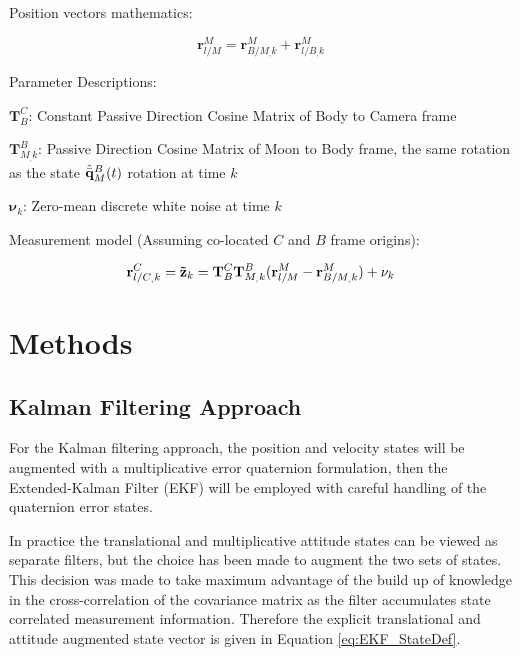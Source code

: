 \documentclass[conf]{new-aiaa}
\newcommand{\vect}[1]{\mathbf{#1}}
\newcommand{\mat}[1]{\mathbf{#1}}
\newcommand{\qBM}{\hat{\Bar{\mathbf{q}}}^B_{M}}    %
\newcommand{\rlO}{\vect{r}^M_{l/M}}
\newcommand{\rBO}{\vect{r}^M_{B/M_,k}}
\newcommand{\rlB}{\vect{r}^M_{l/B_,k}}
\newcommand{\rlBmeas}{\vect{r}^C_{l/C_,k}}
\newcommand{\TBM}{\mat{T}^B_{M_,k}}
\newcommand{\TCB}{\mat{T}^C_{B}}
\begin{document}
\vspace{10pt}

Position vectors mathematics:

\begin{equation}
\rlO = \rBO + \rlB   
\label{eq:MeasRelPosDef}
\end{equation}



Parameter Descriptions:

$\TCB$: Constant Passive Direction Cosine Matrix of Body to Camera frame

$\TBM$: Passive Direction Cosine Matrix of Moon to Body frame, the same rotation as the state $\qBM(t)$ rotation at time $k$

$\vect{\nu}_{k}$: Zero-mean discrete white noise at time $k$

\vspace{10pt}

Measurement model (Assuming co-located $C$ and $B$ frame origins):
\vspace{10pt}

\begin{equation}
\rlBmeas = \vect{\Tilde{z}}_{k} = \TCB \TBM (\rlO - \rBO) + \vect{\nu}_{k}
\label{eq:MeasRelPosModel}
\end{equation}




\section{Methods}
\subsection{Kalman Filtering Approach}
\label{sec:EKFMEKFMeth}

For the Kalman filtering approach, the position and velocity states will be augmented with a multiplicative error quaternion formulation, then the Extended-Kalman Filter (EKF) will be employed with careful handling of the quaternion error states. 

In practice the translational and multiplicative attitude states can be viewed as separate filters, but the choice has been made to augment the two sets of states. This decision was made to take maximum advantage of the build up of knowledge in the cross-correlation of the covariance matrix as the filter accumulates state correlated measurement information. Therefore the explicit translational and attitude augmented state vector is given in Equation \ref{eq:EKF_StateDef}.
\end{document}
